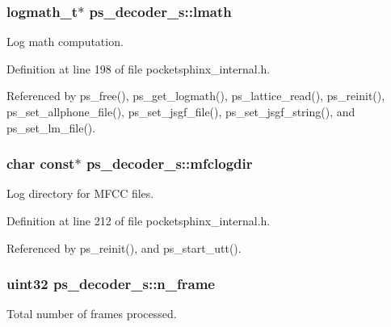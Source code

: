 \subsubsection[{lmath}]{\setlength{\rightskip}{0pt plus 5cm}logmath\+\_\+t$\ast$ ps\+\_\+decoder\+\_\+s\+::lmath}\label{structps__decoder__s_abd17fe329f2fb219c5a534f3217c5b95}


Log math computation. 



Definition at line 198 of file pocketsphinx\+\_\+internal.\+h.



Referenced by ps\+\_\+free(), ps\+\_\+get\+\_\+logmath(), ps\+\_\+lattice\+\_\+read(), ps\+\_\+reinit(), ps\+\_\+set\+\_\+allphone\+\_\+file(), ps\+\_\+set\+\_\+jsgf\+\_\+file(), ps\+\_\+set\+\_\+jsgf\+\_\+string(), and ps\+\_\+set\+\_\+lm\+\_\+file().

\subsubsection[{mfclogdir}]{\setlength{\rightskip}{0pt plus 5cm}char const$\ast$ ps\+\_\+decoder\+\_\+s\+::mfclogdir}\label{structps__decoder__s_a8bb5ef8791798b8dd9bc82b1ec016663}


Log directory for M\+F\+C\+C files. 



Definition at line 212 of file pocketsphinx\+\_\+internal.\+h.



Referenced by ps\+\_\+reinit(), and ps\+\_\+start\+\_\+utt().

\subsubsection[{n\+\_\+frame}]{\setlength{\rightskip}{0pt plus 5cm}uint32 ps\+\_\+decoder\+\_\+s\+::n\+\_\+frame}\label{structps__decoder__s_a2886b321c576c7def449ebb2f37899fd}


Total number of frames processed. 



